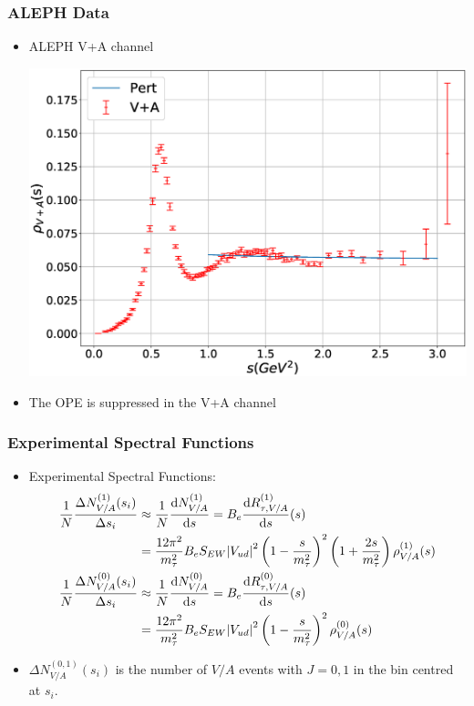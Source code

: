 \documentclass{beamer}
\begin{document}
\begin{frame}
  \frametitle{ALEPH Data}
  \begin{itemize}
  \item ALEPH V+A channel
    \begin{center}
      \includegraphics[width=.8\textwidth]{./images/specFuncAleph_VpA.eps}
    \end{center}
  \item The OPE is suppressed in the V+A channel
  \end{itemize}
\end{frame}

\begin{frame}
  \frametitle{Experimental Spectral Functions}
  \begin{itemize}
  \item Experimental Spectral Functions:
    \begin{align}
      \frac{1}{N} \frac{\Delta N_{V/A}^{(1)}(s_i)}{\Delta s_i}
      &\approx \frac{1}{N} \frac{\dif N_{V/A}^{(1)}}{\dif s} = B_e \frac{\dif R_{\tau, V/A}^{(1)}}{\dif s}(s) \nonumber\\
      &= \frac{12\pi^2}{m_\tau^2} B_e S_{EW} \abs{V_{ud}}^2
        \left( 1 - \frac{s}{m_\tau^2} \right)^2\left( 1 + \frac{2s}{m_\tau^2} \right) \rho_{V/A}^{(1)}(s) \\
      \frac{1}{N} \frac{\Delta N_{V/A}^{(0)}(s_i)}{\Delta s_i}
      &\approx \frac{1}{N} \frac{\dif N_{V/A}^{(0)}}{\dif s} = B_e \frac{\dif R_{\tau, V/A}^{(0)}}{\dif s}(s) \nonumber\\
      &= \frac{12\pi^2}{m_\tau^2} B_e S_{EW} \abs{V_{ud}}^2
        \left( 1 - \frac{s}{m_\tau^2} \right)^2 \rho_{V/A}^{(0)}(s)
    \end{align}
  \item \(\Delta N_{V/A}^{(0,1)}(s_i)\) is the number of \(V/A\) events with
    \(J=0,1\) in the bin centred at \(s_i\).
  \end{itemize}
\end{frame}
\end{document}
